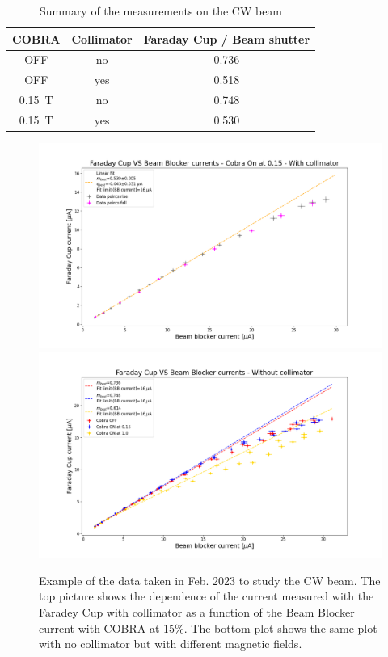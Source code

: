 \begin{refsection}
        \begin{table}[]
            \centering
            \begin{tabular}{c|c|c}
                \hline
                COBRA & Collimator & Faraday Cup / Beam shutter \\
                \hline
                \hline
                OFF & no & 0.736 \\
                OFF & yes & 0.518 \\
                \SI{0.15}{T} & no & 0.748 \\
                \SI{0.15}{T} & yes & 0.530 \\
                \hline
            \end{tabular}
            \caption{Summary of the measurements on the CW beam}
            \label{tab:X17:beam}
        \end{table}

        \begin{figure}
            \centering
            \includegraphics[width = \textwidth]{Figures/X17/H2+/Faraday_Cup_VS_Beam_Blocker_currents_-_Cobra_On_at_0.15_-_With_collimator.png}\\
            \includegraphics[width = \textwidth]{Figures/X17/H2+/Faraday_Cup_VS_Beam_Blocker_currents_-_Without_collimator.png}
            \caption{Example of the data taken in Feb. 2023 to study the CW beam. The top picture shows the dependence of the current measured with the Faradey Cup with collimator as a function of the Beam Blocker current with COBRA at 15\%. The bottom plot shows the same plot with no collimator but with different magnetic fields.}
            \label{fig:X17:H2+}
        \end{figure}


\end{refsection}
